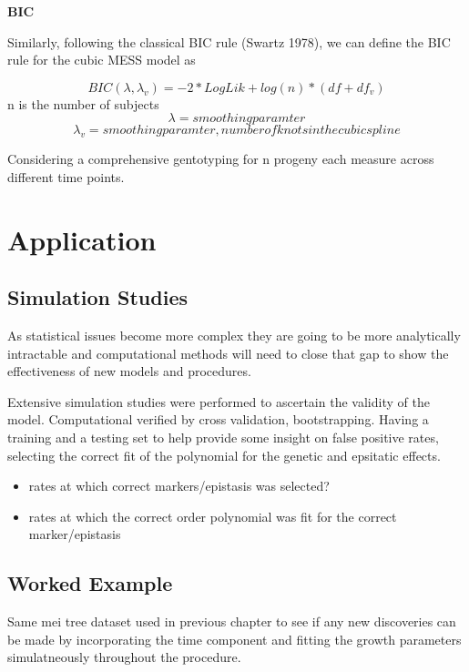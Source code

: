 \documentclass[11pt,]{book}
\providecommand{\tightlist}{%
  \setlength{\itemsep}{0pt}\setlength{\parskip}{0pt}}
\theoremstyle{definition}
\theoremstyle{definition}
\theoremstyle{remark}
\begin{document}
\textbf{BIC}

Similarly, following the classical BIC rule (Swartz 1978), we can define
the BIC rule for the cubic MESS model as

\[BIC(\lambda, \lambda_v ) = -2*LogLik + log(n)*(df + df_v)\] n is the
number of subjects \cite{wu2006nonparametric}
\[\lambda = smoothing paramter\]
\[\lambda_v = smoothing paramter, number of knots in the cubic spline\]

Considering a comprehensive gentotyping for n progeny each measure
across different time points.

\section{Application}\label{application-2}

\subsection{Simulation Studies}\label{simulation-studies-1}

As statistical issues become more complex they are going to be more
analytically intractable and computational methods will need to close
that gap to show the effectiveness of new models and procedures.

Extensive simulation studies were performed to ascertain the validity of
the model. Computational verified by cross validation, bootstrapping.
Having a training and a testing set to help provide some insight on
false positive rates, selecting the correct fit of the polynomial for
the genetic and epsitatic effects.

\begin{itemize}
\tightlist
\item
  rates at which correct markers/epistasis was selected?
\item
  rates at which the correct order polynomial was fit for the correct
  marker/epistasis
\end{itemize}

\subsection{Worked Example}\label{worked-example-1}

Same mei tree dataset used in previous chapter to see if any new
discoveries can be made by incorporating the time component and fitting
the growth parameters simulatneously throughout the procedure.
\end{document}
